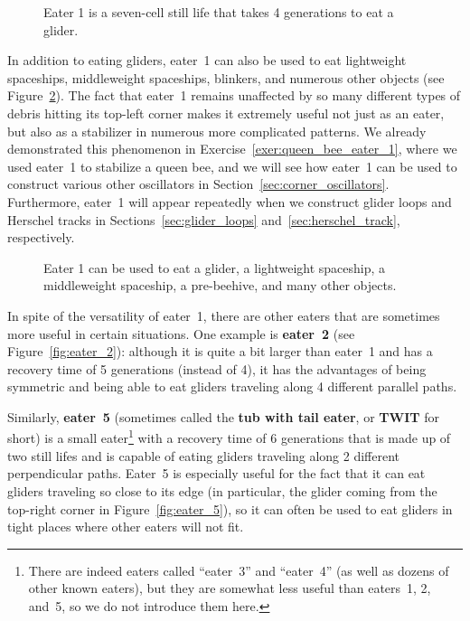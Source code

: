 \begin{figure}[!htb]
	\centering
	\caption{Eater 1 is a seven-cell still life that takes 4 generations to eat a glider.}\label{fig:eater_1}
\end{figure}

In addition to eating gliders, eater~1 can also be used to eat lightweight spaceships, middleweight spaceships, blinkers, and numerous other objects (see Figure~\ref{fig:eater_1_multi}). The fact that eater~1 remains unaffected by so many different types of debris hitting its top-left corner makes it extremely useful not just as an eater, but also as a stabilizer in numerous more complicated patterns. We already demonstrated this phenomenon in Exercise~\ref{exer:queen_bee_eater_1}, where we used eater~1 to stabilize a queen bee, and we will see how eater~1 can be used to construct various other oscillators in Section~\ref{sec:corner_oscillators}. Furthermore, eater~1 will appear repeatedly when we construct glider loops and Herschel tracks in Sections~\ref{sec:glider_loops} and~\ref{sec:herschel_track}, respectively.

\begin{figure}[!htb]
	\centering{}
	\caption{Eater 1 can be used to eat a glider, a lightweight spaceship, a middleweight spaceship, a pre-beehive, and many other objects.}\label{fig:eater_1_multi}
\end{figure}

In spite of the versatility of eater~1, there are other eaters that are sometimes more useful in certain situations. One example is \textbf{eater~2} (see Figure~\ref{fig:eater_2}): although it is quite a bit larger than eater~1 and has a recovery time of 5 generations (instead of 4), it has the advantages of being symmetric and being able to eat gliders traveling along 4 different parallel paths.

Similarly, \textbf{eater~5} (sometimes called the \textbf{tub with tail eater}, or \textbf{TWIT} for short) is a small eater\footnote{There are indeed eaters called ``eater~3'' and ``eater~4'' (as well as dozens of other known eaters), but they are somewhat less useful than eaters~1, 2, and~5, so we do not introduce them here.} with a recovery time of 6 generations that is made up of two still lifes and is capable of eating gliders traveling along 2 different perpendicular paths. Eater~5 is especially useful for the fact that it can eat gliders traveling so close to its edge (in particular, the glider coming from the top-right corner in Figure~\ref{fig:eater_5}), so it can often be used to eat gliders in tight places where other eaters will not fit.

